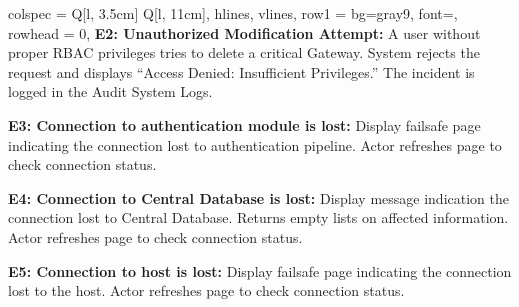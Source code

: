 \begin{longtblr}[
  caption = {UC 4.6: Manage IoT Devices list},
]{
  colspec = {Q[l, 3.5cm] Q[l, 11cm]}, 
  hlines, vlines,
  row{1} = {bg=gray9, font=\bfseries}, 
  rowhead = 0, 
}
\textbf{E2: Unauthorized Modification Attempt:} A user without proper RBAC privileges tries to delete a critical Gateway. System rejects the request and displays ``Access Denied: Insufficient Privileges.'' The incident is logged in the Audit System Logs. \par \vspace{0.5em}
\textbf{E3: Connection to authentication module is lost:} Display failsafe page indicating the connection lost to authentication pipeline. Actor refreshes page to check connection status. \par \vspace{0.5em}
\textbf{E4: Connection to Central Database is lost:} Display message indication the connection lost to Central Database. Returns empty lists on affected information. Actor refreshes page to check connection status. \par \vspace{0.5em}
\textbf{E5: Connection to host is lost:} Display failsafe page indicating the connection lost to the host. Actor refreshes page to check connection status. \\
\end{longtblr}